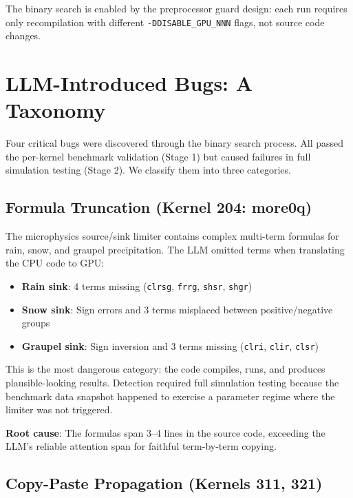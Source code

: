 \documentclass[conference]{IEEEtran}
\begin{document}
The binary search is enabled by the preprocessor guard design: each run
requires only recompilation with different \texttt{-DDISABLE\_GPU\_NNN}
flags, not source code changes.

\section{LLM-Introduced Bugs: A Taxonomy}
\label{sec:bugs}

Four critical bugs were discovered through the binary search process. All
passed the per-kernel benchmark validation (Stage 1) but caused failures in
full simulation testing (Stage 2). We classify them into three categories.

\subsection{Formula Truncation (Kernel 204: more0q)}

The microphysics source/sink limiter contains complex multi-term formulas for
rain, snow, and graupel precipitation. The LLM omitted terms when
translating the CPU code to GPU:

\begin{itemize}
\item \textbf{Rain sink}: 4 terms missing (\texttt{clrsg}, \texttt{frrg},
  \texttt{shsr}, \texttt{shgr})
\item \textbf{Snow sink}: Sign errors and 3 terms misplaced between
  positive/negative groups
\item \textbf{Graupel sink}: Sign inversion and 3 terms missing
  (\texttt{clri}, \texttt{clir}, \texttt{clsr})
\end{itemize}

This is the most dangerous category: the code compiles, runs, and produces
plausible-looking results. Detection required full simulation testing because
the benchmark data snapshot happened to exercise a parameter regime where the
limiter was not triggered.

\textbf{Root cause}: The formulas span 3--4 lines in the source code,
exceeding the LLM's reliable attention span for faithful term-by-term
copying.

\subsection{Copy-Paste Propagation (Kernels 311, 321)}
\end{document}
